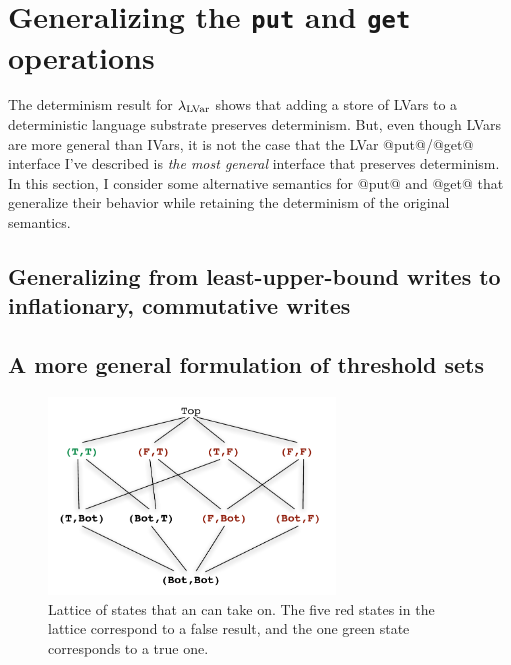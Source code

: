 \section{Generalizing the \lstinline|put| and \lstinline|get| operations}\label{s:lvars-generalizing}

The determinism result for $\lambda_{\textrm{LVar}}$ shows that adding a store of
LVars to a deterministic language substrate preserves determinism.
But, even though LVars are more general than IVars, it is not the case
that the LVar @put@/@get@ interface I've described is \emph{the most
  general} interface that preserves determinism.  In this section, I
consider some alternative semantics for @put@ and @get@ that
generalize their behavior while retaining the determinism of the
original semantics.

\subsection{Generalizing from least-upper-bound writes to inflationary, commutative writes} 




\subsection{A more general formulation of threshold sets}\label{subsection:lvars-a-more-general-formulation-of-threshold-sets}

\begin{figure}
\begin{center}
  \includegraphics[width=3in]{chapter2/figures/lvars-parallel-and.pdf}
\end{center}
  \caption{Lattice of states that an  can take on.  The five
    red states in the lattice correspond to a false result, and the
    one green state corresponds to a true one.}
  \label{f:lvars-parallel-and}
\end{figure}

